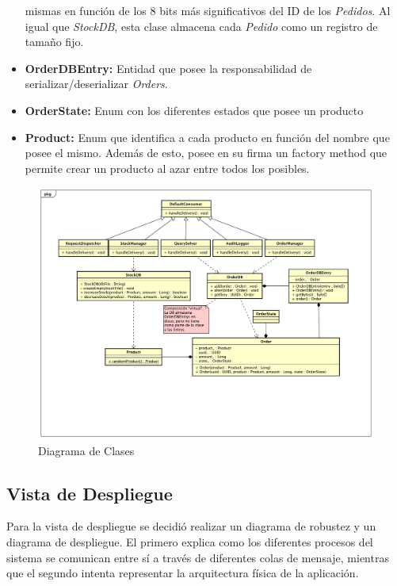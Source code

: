 \documentclass[a4paper,10pt]{article}
\begin{document}
\begin{itemize}
            mismas en función de los 8 bits más significativos del ID de los
            \textit{Pedidos}. Al igual que \textit{StockDB}, esta clase 
            almacena cada \textit{Pedido} como un registro de tamaño fijo.
            \item \textbf{OrderDBEntry:} Entidad que posee la responsabilidad
            de serializar/deserializar \textit{Orders}.
            \item \textbf{OrderState:} Enum con los diferentes estados que 
            posee un producto
            \item \textbf{Product:} Enum que identifica a cada producto en
            función del nombre que posee el mismo. Además de esto, posee en
            su firma un factory method que permite crear un producto al azar
            entre todos los posibles.
    
        \end{itemize}
 
        \newpage
        \begin{figure}[!Hhtb]                                             
            \centering                                                   
            \includegraphics[width=18cm,angle=90,origin=c]{Imagenes/Diagrama_Clases.pdf} 
            \caption{Diagrama de Clases} \label{DiagClases}
        \end{figure}

    \newpage
    \subsection{Vista de Despliegue}
        Para la vista de despliegue se decidió realizar un diagrama de 
        robustez y un diagrama de despliegue. El primero explica como los 
        diferentes procesos del sistema se comunican entre sí a través de 
        diferentes colas de mensaje, mientras que el segundo intenta representar
        la arquitectura física de la aplicación.
        
\end{document}

